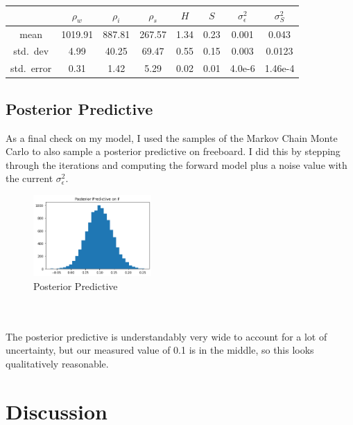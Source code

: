 \documentclass[12pt, letterpaper]{article}
\begin{document}
\medskip
\begin{center}
\begin{tabular} { |c|c|c|c|c|c|c|c| }

\hline
             &$\rho_w$ & $\rho_i $& $\rho_s$ & $H$ & $S$ & $\sigma^2_\epsilon$ & $\sigma^2_S$ \\
\hline
mean         & 1019.91  &887.81    & 267.57  & 1.34& 0.23&    0.001            &  0.043       \\
std.\ dev    & 4.99     & 40.25    & 69.47   &0.55 & 0.15&    0.003          &   0.0123        \\
std.\ error  & 0.31     & 1.42     & 5.29     &0.02 &0.01&    4.0e-6         &  1.46e-4         \\
\hline

\end{tabular}
\end{center}
\medskip

\subsection{Posterior Predictive}
As a final check on my model, I used the samples of the Markov Chain Monte Carlo to also sample a posterior predictive on freeboard.
I did this by stepping through the iterations and computing the forward model plus a noise value with the current $\sigma^2_\epsilon$.
\begin{figure}[h]
\centering
\caption{Posterior Predictive}
\includegraphics[width=0.4\textwidth]{predictive.png}
\end{figure}
\\\\
The posterior predictive is understandably very wide to account for a lot of uncertainty, but our measured value of 0.1 is in the middle,
so this looks qualitatively reasonable.

\section{Discussion}
\end{document}
